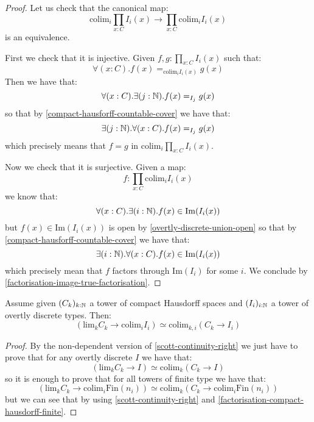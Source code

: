 \begin{proof}
Let us check that the canonical map:
\[\mathrm{colim}_i \prod_{x:C} I_i(x) \to \prod_{x:C} \mathrm{colim}_i I_i(x) \]
is an equivalence. 

First we check that it is injective. Given $f,g:\prod_{x:C} I_i(x)$ such that:
\[\forall(x:C).  f(x) =_{\mathrm{colim}_iI_i(x)} g(x)\]
Then we have that:
\[\forall(x:C).  \exists(j:\mathbb{N}). f(x) =_{I_j} g(x)\]
so that by \cref{compact-hausforff-countable-cover} we have that:
\[\exists(j:\mathbb{N}). \forall(x:C). f(x) =_{I_j} g(x)\]
which precisely means that $f=g$ in $\mathrm{colim}_i \prod_{x:C} I_i(x)$.

Now we check that it is surjective. Given a map:
\[f: \prod_{x:C} \mathrm{colim}_i I_i(x)\]
we know that:
\[\forall(x:C). \exists(i:\mathbb{N}). f(x)\in \mathrm{Im}(I_i(x))\]
but $f(x)\in \mathrm{Im}(I_i(x))$ is open by \cref{overtly-discrete-union-open} so that by \cref{compact-hausforff-countable-cover} we have that:
\[\exists(i:\mathbb{N}). \forall(x:C).  f(x)\in \mathrm{Im}(I_i(x))\]
which precisely mean that $f$ factors through $\mathrm{Im}(I_i)$ for some $i$. We conclude by \cref{factorisation-image-true-factorisation}.
\end{proof}

\begin{theorem}\label{scott-continuity}
Assume given $(C_k)_{k:\mathbb{N}}$ a tower of compact Hausdorff spaces and $(I_i)_{i:\mathbb{N}}$ a tower of overtly discrete types. Then:
\[\left( \mathrm{lim}_k C_k \to \mathrm{colim}_i I_i\right) \simeq \mathrm{colim}_{k,i} (C_k\to I_i)\]
\end{theorem}

\begin{proof}
By the non-dependent version of \cref{scott-continuity-right} we just have to prove that for any overtly discrete $I$ we have that:
\[(\mathrm{lim}_kC_k\to I) \simeq \mathrm{colim}_k(C_k\to I)\]
so it is enough to prove that for all towers of finite type we have that:
\[(\mathrm{lim}_kC_k\to \mathrm{colim}_i\mathrm{Fin}(n_i)) \simeq \mathrm{colim}_k(C_k\to \mathrm{colim}_i\mathrm{Fin}(n_i))\]
but we can see that by using \cref{scott-continuity-right} and \cref{factorisation-compact-hausdorff-finite}.
\end{proof}


